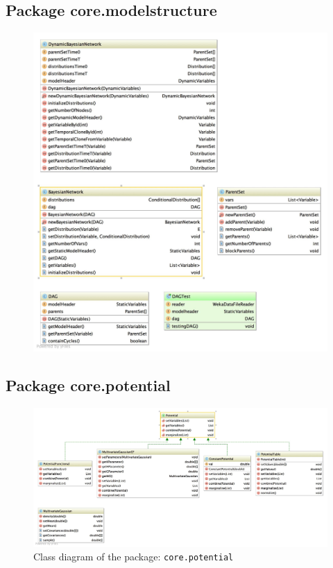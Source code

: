 \subsection{Package core.modelstructure}
\begin{figure}[H]
  \centering
    \includegraphics[width=\textwidth]{ClassDiagrams/core_modelstructure.jpg}
\end{figure}


\subsection{Package core.potential}
\begin{figure}[H]
  \caption{Class diagram of the package: \texttt{core.potential}}
  \centering
    \includegraphics[width=\textwidth]{ClassDiagrams/core_potential.jpg}
\end{figure}

